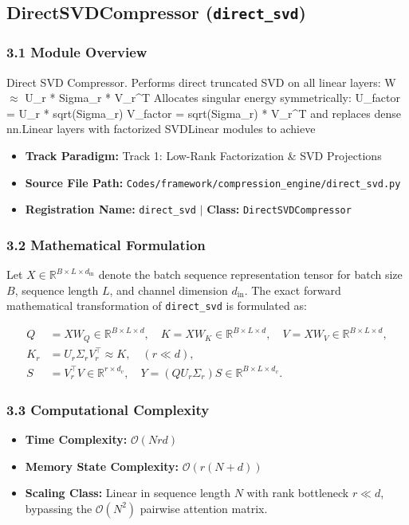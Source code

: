 \subsection{DirectSVDCompressor (\texttt{direct\_svd})}
\label{sec:app_module_direct\_svd}

\subsubsection*{3.1 Module Overview}
Direct SVD Compressor.  Performs direct truncated SVD on all linear layers:     W $\approx$ U\_r * Sigma\_r * V\_r^T Allocates singular energy symmetrically:     U\_factor = U\_r * sqrt(Sigma\_r)     V\_factor = sqrt(Sigma\_r) * V\_r^T and replaces dense nn.Linear layers with factorized SVDLinear modules to achieve
\begin{itemize}
    \item \textbf{Track Paradigm:} Track 1: Low-Rank Factorization & SVD Projections
    \item \textbf{Source File Path:} \texttt{Codes/framework/compression\_engine/direct\_svd.py}
    \item \textbf{Registration Name:} \texttt{direct\_svd} $\mid$ \textbf{Class:} \texttt{DirectSVDCompressor}
\end{itemize}

\subsubsection*{3.2 Mathematical Formulation}
Let $X \in \mathbb{R}^{B \times L \times d_{\text{in}}}$ denote the batch sequence representation tensor for batch size $B$, sequence length $L$, and channel dimension $d_{\text{in}}$. The exact forward mathematical transformation of \texttt{direct\_svd} is formulated as:

\begin{align}
Q &= X W_Q \in \mathbb{R}^{B \times L \times d}, \quad K = X W_K \in \mathbb{R}^{B \times L \times d}, \quad V = X W_V \in \mathbb{R}^{B \times L \times d}, \\
K_r &= U_r \Sigma_r V_r^\top \approx K, \quad (r \ll d), \\
S &= V_r^\top V \in \mathbb{R}^{r \times d_v}, \quad Y = (Q U_r \Sigma_r) S \in \mathbb{R}^{B \times L \times d_v}.
\end{align}


\subsubsection*{3.3 Computational Complexity}
\begin{itemize}
    \item \textbf{Time Complexity:} $\mathcal{O}(N r d)$
    \item \textbf{Memory State Complexity:} $\mathcal{O}(r(N + d))$
    \item \textbf{Scaling Class:} Linear in sequence length $N$ with rank bottleneck $r \ll d$, bypassing the $\mathcal{O}(N^2)$ pairwise attention matrix.
\end{itemize}

